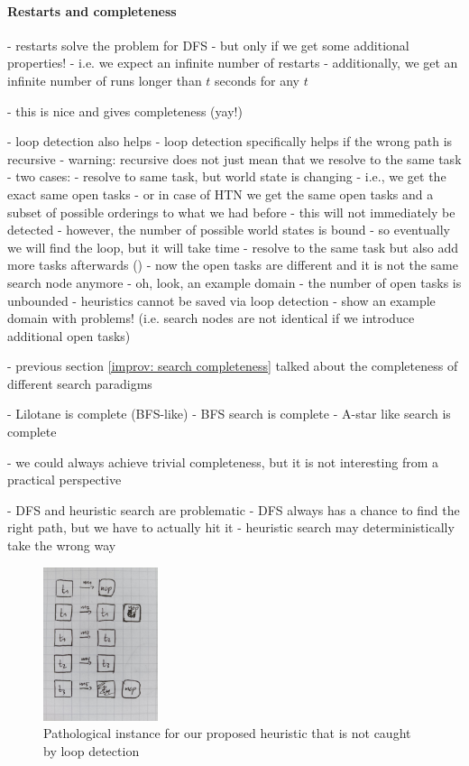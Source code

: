 \paragraph{Restarts and completeness}

- restarts solve the problem for DFS
- but only if we get some additional properties!
- i.e. we expect an infinite number of restarts
- additionally, we get an infinite number of runs longer than $t$ seconds for any $t$

- this is nice and gives completeness (yay!)

- loop detection also helps
- loop detection specifically helps if the wrong path is recursive
- warning: recursive does not just mean that we resolve to the same task
- two cases:
	- resolve to same task, but world state is changing
		- i.e., we get the exact same open tasks
		- or in case of HTN we get the same open tasks and a subset of possible orderings to what we had before
		- this will not immediately be detected
		- however, the number of possible world states is bound
		- so eventually we will find the loop, but it will take time
	- resolve to the same task but also add more tasks afterwards ()
		- now the open tasks are different and it is not the same search node anymore
		- oh, look, an example domain
		- the number of open tasks is unbounded
- heuristics cannot be saved via loop detection
- show an example domain with problems! (i.e. search nodes are not identical if we introduce additional open tasks)


- previous section \ref{improv: search completeness} talked about the completeness of different search paradigms

- Lilotane is complete (BFS-like)
- BFS search is complete
- A-star like search is complete

- we could always achieve trivial completeness, but it is not interesting from a practical perspective

- DFS and heuristic search are problematic
- DFS always has a chance to find the right path, but we have to actually hit it
- heuristic search may deterministically take the wrong way

\begin{figure}
	\caption{Pathological instance for our proposed heuristic that is not caught by loop detection}
	\label{figure: pathological heuristic loop}
	\centering
	\includegraphics[width=0.3\textwidth]{images/prelim/loop_detection_pathological}
\end{figure}